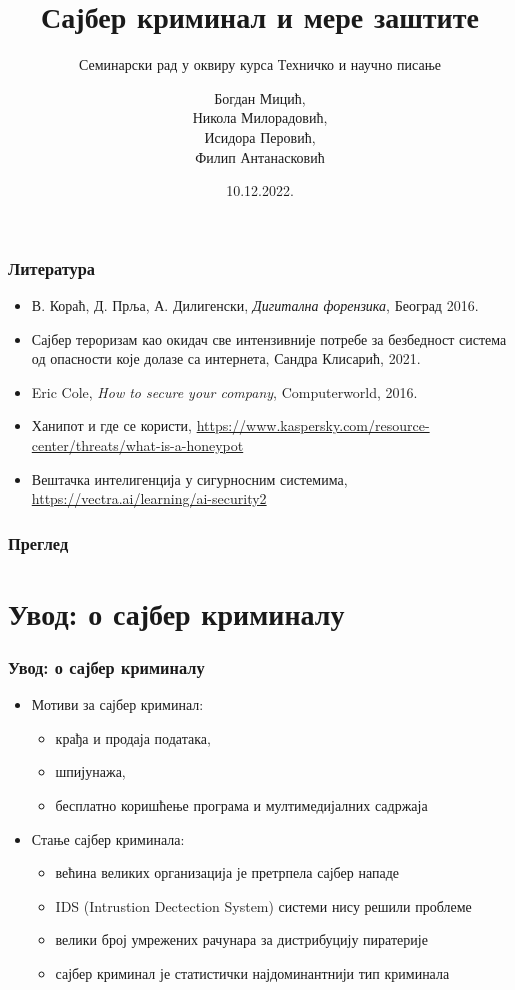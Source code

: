 \documentclass{beamer}
\title{Сајбер криминал и мере заштите}
\subtitle{Семинарски рад у оквиру курса Техничко и научно писање}
\author{Богдан Мицић, \\Никола Милорадовић, \\Исидора Перовић, \\Филип Антанасковић}
\institute{Математички факултет\\Универзитет у Београду}
\date{
  \footnotesize{10.12.2022.}
}
\begin{document}
\begin{frame}
  \thispagestyle{empty}
  \titlepage{}
\end{frame}
\addtocounter{framenumber}{-1}

\begin{frame}[fragile]\frametitle{Литература}
  \begin{itemize}
    \item В. Кораћ, Д. Прља, А. Дилигенски, \emph{Дигитална форензика}, Београд 2016.
    \item Сајбер тероризам као окидач све интензивније потребе за безбедност система од опасности које долазе са интернета, Сандра Клисарић, 2021.
    \item Eric Cole, \emph{How to secure your company}, Computerworld, 2016.
    \item Ханипот и где се користи, \url{https://www.kaspersky.com/resource-center/threats/what-is-a-honeypot}
    \item Вештачка интелигенција у сигурносним системима, \url{https://vectra.ai/learning/ai-security2}
  \end{itemize}
\end{frame}

\begin{frame}
	\frametitle{Преглед}
	\tableofcontents
\end{frame}

\section{Увод: о сајбер криминалу}

\begin{frame}\frametitle{Увод: о сајбер криминалу}
  \begin{itemize}
    \item Мотиви за сајбер криминал:
    \begin{itemize}
      \item крађа и продаја података,
      \item шпијунажа,
      \item бесплатно коришћење програма и мултимедијалних садржаја
    \end{itemize}
    \item Стање сајбер криминала:
    \begin{itemize}
      \item већина великих организација је претрпела сајбер нападе
      \item IDS (Intrustion Dectection System) системи нису решили проблеме
      \item велики број умрежених рачунара за дистрибуцију пиратерије
      \item сајбер криминал је статистички најдоминантнији тип криминала
    \end{itemize}
  \end{itemize}
\end{frame}
\end{document}
